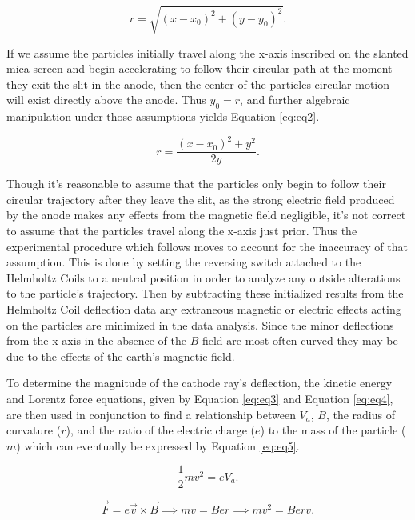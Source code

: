 \documentclass[prb,preprint]{revtex4-1}
\begin{document}
	\begin{equation}\label{eq:eq1}
		r=\sqrt{\left(x-x_0\right)^2+\left(y-y_0\right)^2}.
	\end{equation}

If we assume the particles initially travel along the x-axis inscribed on the slanted mica screen and begin accelerating to follow their circular path at the moment they exit the slit in the anode, then the center of the particles circular motion will exist directly above the anode. Thus $y_0=r$, and further algebraic manipulation under those assumptions yields Equation \eqref{eq:eq2}.

	\begin{equation}\label{eq:eq2}
		r=\frac{\left(x-x_0\right)^2+y^2}{2y}.
	\end{equation}

Though it's reasonable to assume that the particles only begin to follow their circular trajectory after they leave the slit, as the strong electric field produced by the anode makes any effects from the magnetic field negligible, it's not correct to assume that the particles travel along the x-axis just prior. Thus the experimental procedure which follows moves to account for the inaccuracy of that assumption. This is done by setting the reversing switch attached to the Helmholtz Coils to a neutral position in order to analyze any outside alterations to the particle's trajectory. Then by subtracting these initialized results from the Helmholtz Coil deflection data any extraneous magnetic or electric effects acting on the particles are minimized in the data analysis. Since the minor deflections from the x axis in the absence of the $B$ field are most often curved they may be due to the effects of the earth's magnetic field.

To determine the magnitude of the cathode ray's deflection, the kinetic energy and Lorentz force equations, given by Equation \eqref{eq:eq3} and Equation \eqref{eq:eq4}, are then used in conjunction to find a relationship between $V_a$, $B$, the radius of curvature ($r$), and the ratio of the electric charge (${e}$) to the mass of the particle (${m}$) which can eventually be expressed by Equation \eqref{eq:eq5}.

	\begin{equation}\label{eq:eq3}
		\frac{1}{2}mv^2=eV_a.
	\end{equation}

	\begin{equation}\label{eq:eq4}
		\vec{F}=e\vec{v}\times \vec{B} \implies mv=Ber \implies mv^2=Berv.
	\end{equation}
\end{document}
